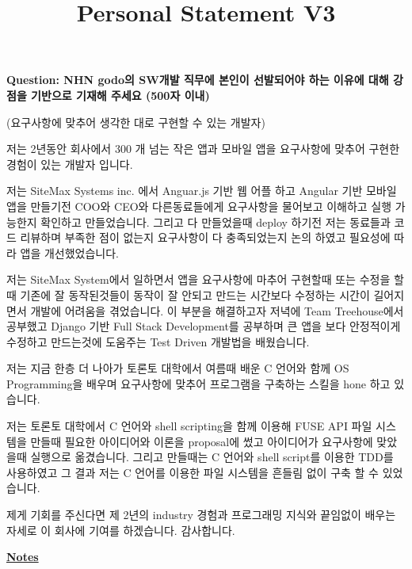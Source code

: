\documentclass[12pt]{article}
\begin{document}
\title{Personal Statement V3}
\maketitle

\textbf{Question: NHN godo의 SW개발 직무에 본인이 선발되어야 하는 이유에 대해 강점을 기반으로 기재해 주세요 (500자 이내)}

\bigskip

(요구사항에 맞추어 생각한 대로 구현할 수 있는 개발자)

\bigskip

저는 2년동안 회사에서 300 개 넘는 작은 앱과 모바일 앱을 요구사항에 맞추어 구현한 경험이 있는 개발자 입니다.

\bigskip

저는 SiteMax Systems inc. 에서 Anguar.js 기반 웹 어플 하고 Angular 기반 모바일 앱을 만들기전 COO와 CEO와 다른동료들에게 요구사항을 물어보고 이해하고 실행 가능한지 확인하고 만들었습니다.
그리고 다 만들었을때 deploy 하기전 저는 동료들과 코드 리뷰하며 부족한 점이 없는지 요구사항이 다 충족되었는지 논의 하였고 필요성에 따라 앱을 개선했었습니다.

\bigskip

저는 SiteMax System에서 일하면서 앱을 요구사항에 마추어 구현할때 또는 수정을 할때 기존에 잘 동작된것들이 동작이 잘 안되고
만드는 시간보다 수정하는 시간이 길어지면서 개발에 어려움을 겪었습니다. 이 부분을 해결하고자 저녁에
Team Treehouse에서 공부했고 Django 기반 Full Stack Development를 공부하며 큰 앱을 보다 안정적이게
수정하고 만드는것에 도움주는 Test Driven 개발법을 배웠습니다.

\bigskip

저는 지금 한층 더 나아가 토론토 대학에서 여름때 배운 C 언어와 함께 OS Programming을 배우며 요구사항에 맞추어 프로그램을 구축하는 스킬을 hone 하고 있습니다.

\bigskip

저는 토론토 대학에서 C 언어와 shell scripting을 함께 이용해 FUSE API 파일 시스템을 만들때
필요한 아이디어와 이론을 proposal에 썼고 아이디어가 요구사항에 맞았을때 실행으로 옮겼습니다.
그리고 만들때는 C 언어와 shell script를 이용한 TDD를 사용하였고 그 결과 저는 C 언어를 이용한 파일 시스템을 흔들림 없이 구축 할 수 있었습니다.

\bigskip

제게 기회를 주신다면 제 2년의 industry 경험과 프로그래밍 지식와 끝임없이 배우는 자세로 이 회사에 기여를 하겠습니다. 감사합니다.

\underline{\textbf{Notes}}
\end{document}
